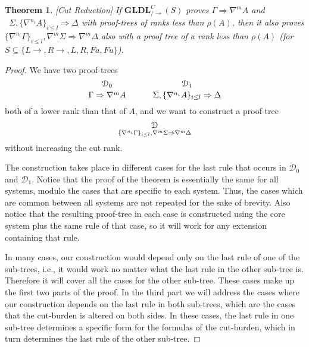 \documentclass[12pt,a4paper]{article}
\theoremstyle{plain}
\newtheorem{thm}{Theorem}[section]
\theoremstyle{definition}
\begin{document}
\begin{thm}\label{thm:ldls-cut-reduction}[Cut Reduction]
If $\mathbf{GLDL}^C_{/\rightarrow}(S)$ proves $\Gamma \Rightarrow \nabla^m A$ and\\\ $\Sigma , \{\nabla^{n_i} A\}_{i \leq l} \Rightarrow \Delta$ with proof-trees of ranks less than $\rho(A)$, then it also proves $\{\nabla^{n_i} \Gamma\}_{i \leq l} , \nabla^m\Sigma \Rightarrow \nabla^m\Delta$ also with a proof tree of a rank less than $\rho(A)$ (for $S \subseteq \{L\rightarrow, R\rightarrow, L, R, Fa, Fu\}$).
\end{thm}
\begin{proof}
	We have two proof-trees
  \[
    {\mathcal{D}_0
    \atop
    \Gamma \Rightarrow \nabla^m A}
    \hspace{3em}
    {\mathcal{D}_1
    \atop
    \Sigma , \{\nabla^{n_i} A\}_{i \leq l} \Rightarrow \Delta}
  \]
  both of a lower rank than that of $A$, and we want to construct a proof-tree
  \[\mathcal{D} \atop \{\nabla^{n_i} \Gamma\}_{i \leq l} , \nabla^m \Sigma \Rightarrow \nabla^m \Delta \]
  without increasing the cut rank.

	The construction takes place in different cases for the last rule that occurs in $\mathcal{D}_0$ and $\mathcal{D}_1$. Notice that the proof of the theorem is essentially the same for all systems, modulo the cases that are specific to each system. Thus, the cases which are common between all systems are not repeated for the sake of brevity. Also notice that the resulting proof-tree in each case is constructed using the core system plus the same rule of that case, so it will work for any extension containing that rule.

	In many cases, our construction would depend only on the last rule of one of the sub-trees, i.e., it would work no matter what the last rule in the other sub-tree is. Therefore it will cover all the cases for the other sub-tree. These cases make up the first two parts of the proof. In the third part we will address the cases where our construction depends on the last rule in both sub-trees, which are the cases that the cut-burden is altered on both sides. In these cases, the last rule in one sub-tree determines a specific form for the formulas of the cut-burden, which in turn determines the last rule of the other sub-tree.


\end{proof}
\end{document}
